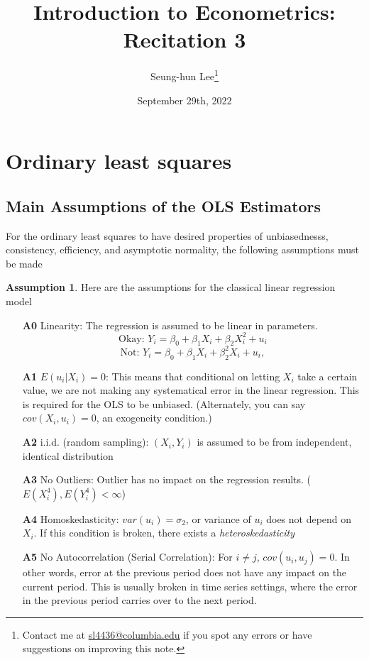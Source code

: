 \documentclass[12pt]{article}
\title{Introduction to Econometrics: Recitation 3}
\theoremstyle{definition}
\theoremstyle{property}
\theoremstyle{assumption}
\newtheorem{assumption}{Assumption}[section]
\theoremstyle{example}
\theoremstyle{comment}
\begin{document}
\linespread{1.25}
\onehalfspacing

\author{Seung-hun Lee\footnote{Contact me at \href{mailto:sl4436@columbia.edu}{sl4436@columbia.edu} if you spot any errors or have suggestions on improving this note.}}
\date{September 29th, 2022}
\maketitle
\thispagestyle{firstpage}


\section{Ordinary least squares}

\subsection{Main Assumptions of the OLS Estimators}
For the ordinary least squares to have desired properties of unbiasednesss, consistency, efficiency, and asymptotic normality, the following assumptions must be made
\begin{mdframed}[backgroundcolor=blue!5] 
\begin{assumption} Here are the assumptions for the classical linear regression model
\begin{itemize}
\item[\textbf{A0}] Linearity: The regression is assumed to be linear in parameters.
\[
\text{Okay: } Y_i = \beta_0 + \beta_1X_i + \beta_2X_i^2+u_i 
\]
\[
\text{Not: } Y_i = \beta_0 + \beta_1X_i + \beta_2^2X_i+u_i,
\]
\item[\textbf{A1}] $E(u_i|X_i)=0$: This means that conditional on letting $X_i$ take a certain value, we are not making any systematical error in the linear regression. This is required for the OLS to be unbiased. (Alternately, you can say $cov(X_i,u_i)=0$, an exogeneity condition.)
\item[\textbf{A2}] i.i.d. (random sampling): $(X_i,Y_i)$ is assumed to be from independent, identical distribution
\item[\textbf{A3}] No Outliers: Outlier has no impact on the regression results. ($E(X_i^4), E(Y_i^4)<\infty$)
\item[\textbf{A4}] Homoskedasticity: $var(u_i)=\sigma_2$, or variance of $u_i$ does not depend on $X_i$. If this condition is broken, there exists a \textit{heteroskedasticity}
\item[\textbf{A5}] No Autocorrelation (Serial Correlation): For $i\neq j$, $cov(u_i,u_j)=0$. In other words, error at the previous period does not have any impact on the current period. This is usually broken in time series settings, where the error in the previous period carries over to the next period.
\end{itemize}
\end{assumption}
\end{mdframed}
\end{document}
